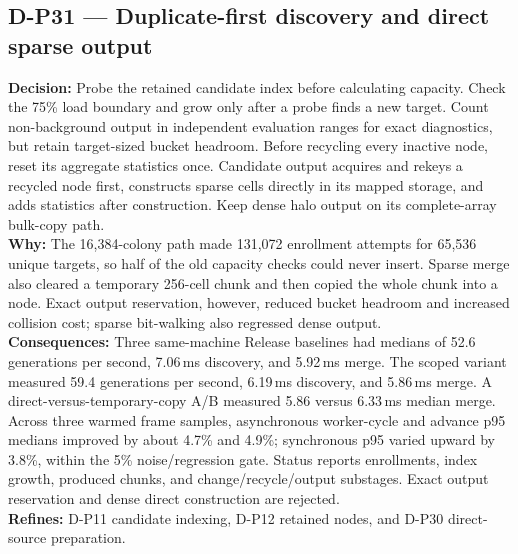 \subsection*{D-P31 --- Duplicate-first discovery and direct sparse output}
\begin{decisionbox}[title={D-P31 \quad 2026-08-16}]
\textbf{Decision:} Probe the retained candidate index before calculating
capacity. Check the 75\% load boundary and grow only after a probe finds a new
target. Count non-background output in independent evaluation ranges for exact
diagnostics, but retain target-sized bucket headroom. Before recycling every
inactive node, reset its aggregate statistics once. Candidate output acquires
and rekeys a recycled node first, constructs sparse cells directly in its
mapped storage, and adds statistics after construction. Keep dense halo output
on its complete-array bulk-copy path.\\
\textbf{Why:} The 16,384-colony path made 131,072 enrollment attempts for
65,536 unique targets, so half of the old capacity checks could never insert.
Sparse merge also cleared a temporary 256-cell chunk and then copied the whole
chunk into a node. Exact output reservation, however, reduced bucket headroom
and increased collision cost; sparse bit-walking also regressed dense output.\\
\textbf{Consequences:} Three same-machine Release baselines had medians of
52.6 generations per second, 7.06\,ms discovery, and 5.92\,ms merge. The scoped
variant measured 59.4 generations per second, 6.19\,ms discovery, and 5.86\,ms
merge. A direct-versus-temporary-copy A/B measured 5.86 versus 6.33\,ms median
merge. Across three warmed frame samples, asynchronous worker-cycle and advance
p95 medians improved by about 4.7\% and 4.9\%; synchronous p95 varied upward by
3.8\%, within the 5\% noise/regression gate. Status reports enrollments, index
growth, produced chunks, and change/recycle/output substages. Exact output
reservation and dense direct construction are rejected.\\
\textbf{Refines:} D-P11 candidate indexing, D-P12 retained nodes, and D-P30
direct-source preparation.
\end{decisionbox}

